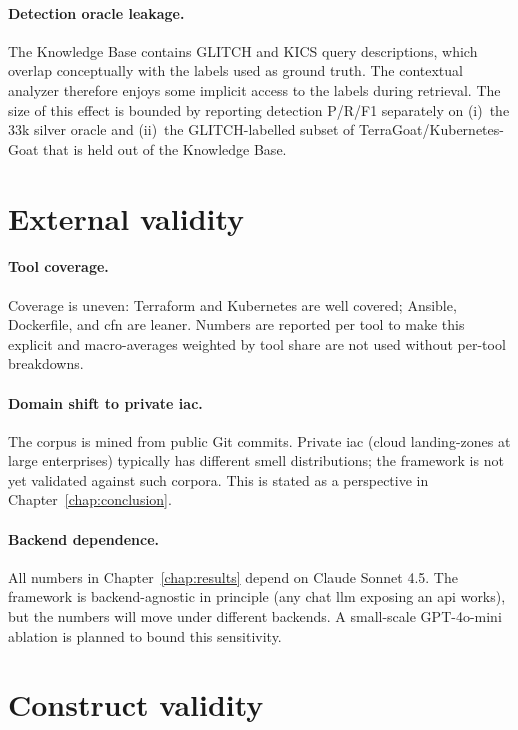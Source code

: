 \documentclass[12pt, a4paper]{report}
\begin{document}
\paragraph{Detection oracle leakage.}
The Knowledge Base contains GLITCH and KICS query descriptions, which
overlap conceptually with the labels used as ground truth. The
contextual analyzer therefore enjoys some implicit access to the labels
during retrieval. The size of this effect is bounded by reporting
detection P/R/F1 separately on (i)~the 33k silver oracle and (ii)~the
GLITCH-labelled subset of TerraGoat/Kubernetes-Goat that is held out of
the Knowledge Base.

\section{External validity}

\paragraph{Tool coverage.}
Coverage is uneven: Terraform and Kubernetes are well covered; Ansible,
Dockerfile, and \gls{cfn} are leaner. Numbers are reported per tool to
make this explicit and macro-averages weighted by tool share are not used
without per-tool breakdowns.

\paragraph{Domain shift to private \gls{iac}.}
The corpus is mined from public Git commits. Private \gls{iac} (cloud
landing-zones at large enterprises) typically has different smell
distributions; the framework is not yet validated against such corpora.
This is stated as a perspective in Chapter~\ref{chap:conclusion}.

\paragraph{Backend dependence.}
All numbers in Chapter~\ref{chap:results} depend on Claude Sonnet 4.5.
The framework is backend-agnostic in principle (any chat \gls{llm}
exposing an \gls{api} works), but the numbers will move under different
backends. A small-scale GPT-4o-mini ablation is planned to bound this
sensitivity.

\section{Construct validity}
\end{document}
